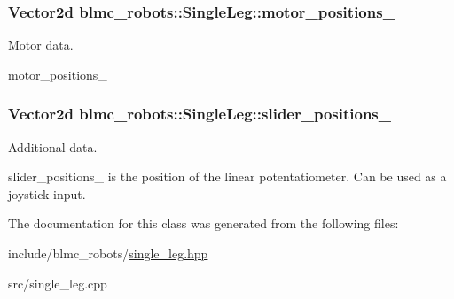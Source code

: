 \subsubsection[{\texorpdfstring{motor\+\_\+positions\+\_\+}{motor_positions_}}]{\setlength{\rightskip}{0pt plus 5cm}Vector2d blmc\+\_\+robots\+::\+Single\+Leg\+::motor\+\_\+positions\+\_\+\hspace{0.3cm}{\ttfamily [private]}}\hypertarget{classblmc__robots_1_1SingleLeg_aca1dec9ed5af5052f23942731ac99386}{}\label{classblmc__robots_1_1SingleLeg_aca1dec9ed5af5052f23942731ac99386}


Motor data. 

motor\+\_\+positions\+\_\+ 
\subsubsection[{\texorpdfstring{slider\+\_\+positions\+\_\+}{slider_positions_}}]{\setlength{\rightskip}{0pt plus 5cm}Vector2d blmc\+\_\+robots\+::\+Single\+Leg\+::slider\+\_\+positions\+\_\+\hspace{0.3cm}{\ttfamily [private]}}\hypertarget{classblmc__robots_1_1SingleLeg_af841dc84f18c70c85bb0e19dd88da85f}{}\label{classblmc__robots_1_1SingleLeg_af841dc84f18c70c85bb0e19dd88da85f}


Additional data. 

slider\+\_\+positions\+\_\+ is the position of the linear potentatiometer. Can be used as a joystick input. 

The documentation for this class was generated from the following files\+:\begin{DoxyCompactItemize}
\item 
include/blmc\+\_\+robots/\hyperlink{single__leg_8hpp}{single\+\_\+leg.\+hpp}\item 
src/single\+\_\+leg.\+cpp\end{DoxyCompactItemize}
